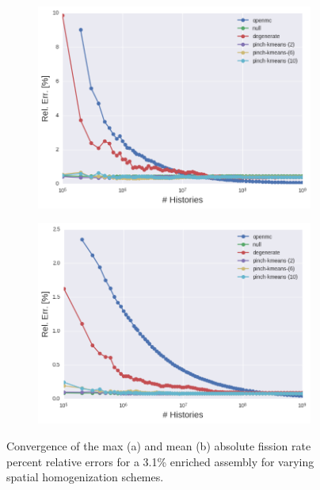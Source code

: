 \clearpage

\begin{figure}[h!]
\centering
\begin{subfigure}{\textwidth}
  \centering
  \includegraphics[width=0.9\linewidth]{figures/results/assm-31/pca-transform/evo-fission-max}
  \caption{}
  \label{fig:chap11-assm-3.1-fission-converge-max}
\end{subfigure}
\begin{subfigure}{\textwidth}
  \centering
  \includegraphics[width=0.9\linewidth]{figures/results/assm-31/pca-transform/evo-fission-mean}
  \caption{}
  \label{fig:chap11-assm-3.1-fission-converge-mean}
\end{subfigure}
\vspace{2mm}
\caption[Fission rate covergence for a 3.1\% enriched assembly]{Convergence of the max (a) and mean (b) absolute fission rate percent relative errors for a 3.1\% enriched assembly for varying spatial homogenization schemes.}
\label{fig:chap11-assm-3.1-fission-converge}
\end{figure}

